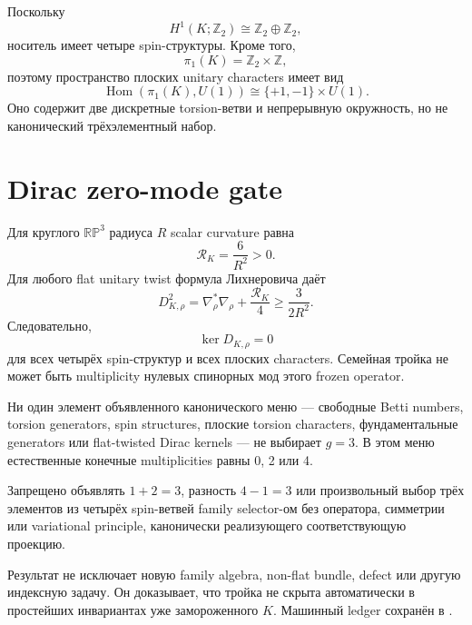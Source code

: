Поскольку
\begin{equation}
H^1(K;\mathbb Z_2)\cong\mathbb Z_2\oplus\mathbb Z_2,
\end{equation}
носитель имеет четыре spin-структуры. Кроме того,
\begin{equation}
\pi_1(K)=\mathbb Z_2\times\mathbb Z,
\end{equation}
поэтому пространство плоских unitary characters имеет вид
\begin{equation}
\operatorname{Hom}(\pi_1(K),U(1))\cong\{+1,-1\}\times U(1).
\end{equation}
Оно содержит две дискретные torsion-ветви и непрерывную окружность, но не
канонический трёхэлементный набор.

\section{Dirac zero-mode gate}

Для круглого \(\mathbb{RP}^3\) радиуса \(R\) scalar curvature равна
\begin{equation}
\mathcal R_K=\frac{6}{R^2}>0.
\end{equation}
Для любого flat unitary twist формула Лихнеровича даёт
\begin{equation}
D_{K,\rho}^2=\nabla_\rho^*\nabla_\rho+\frac{\mathcal R_K}{4}
\geq \frac{3}{2R^2}.
\end{equation}
Следовательно,
\begin{equation}
\ker D_{K,\rho}=0
\end{equation}
для всех четырёх spin-структур и всех плоских characters. Семейная тройка не
может быть multiplicity нулевых спинорных мод этого frozen operator.

\begin{theorem}
Ни один элемент объявленного канонического меню --- свободные Betti numbers,
torsion generators, spin structures, плоские torsion characters,
фундаментальные generators или flat-twisted Dirac kernels --- не выбирает
\(g=3\). В этом меню естественные конечные multiplicities равны 0, 2 или 4.
\end{theorem}

\begin{nogocriterion}
Запрещено объявлять \(1+2=3\), разность \(4-1=3\) или произвольный выбор
трёх элементов из четырёх spin-ветвей family selector-ом без оператора,
симметрии или variational principle, канонически реализующего соответствующую
проекцию.
\end{nogocriterion}

Результат не исключает новую family algebra, non-flat bundle, defect или
другую индексную задачу. Он доказывает, что тройка не скрыта автоматически в
простейших инвариантах уже замороженного \(K\). Машинный ledger сохранён в
.